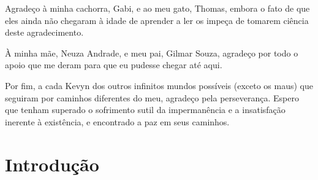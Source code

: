 \documentclass[12pt, a4paper, twoside]{article}
\numberwithin{equation}{subsection} %
\begin{document}
Agradeço à minha cachorra, Gabi, e ao meu gato, Thomas, embora o fato de que eles ainda não chegaram à idade de aprender a ler os impeça de tomarem ciência deste agradecimento.

À minha mãe, Neuza Andrade, e meu pai, Gilmar Souza, agradeço por todo o apoio que me deram para que eu pudesse chegar até aqui.

Por fim, a cada Kevyn dos outros infinitos mundos possíveis (exceto os maus) que seguiram por caminhos diferentes do meu, agradeço pela perseverança. Espero que tenham superado o sofrimento sutil da impermanência e a insatisfação inerente à existência, e encontrado a paz em seus caminhos.

\newpage


%
%
%

  
\newpage



\listoftables

\newpage

\listoffigures

\newpage

\listofmodelo

\newpage
\tableofcontents

\newpage

\setcounter{page}{8}

\section{\textbf{Introdução}}

\end{document}
